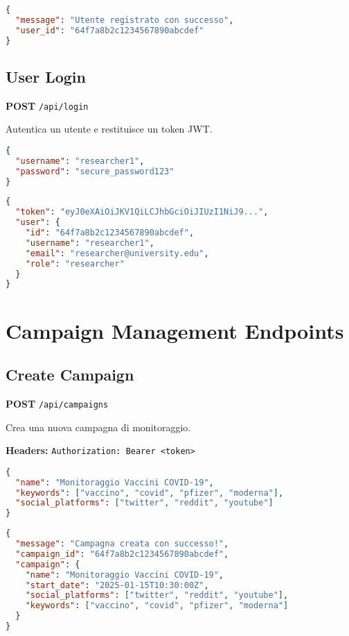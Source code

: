 \documentclass[12pt,a4paper]{report}
\begin{document}
\begin{lstlisting}[language=json, caption=Response (201 Created)]
{
  "message": "Utente registrato con successo",
  "user_id": "64f7a8b2c1234567890abcdef"
}
\end{lstlisting}

\subsection{User Login}

\textbf{POST} \texttt{/api/login}

Autentica un utente e restituisce un token JWT.

\begin{lstlisting}[language=json, caption=Request Body]
{
  "username": "researcher1",
  "password": "secure_password123"
}
\end{lstlisting}

\begin{lstlisting}[language=json, caption=Response (200 OK)]
{
  "token": "eyJ0eXAiOiJKV1QiLCJhbGciOiJIUzI1NiJ9...",
  "user": {
    "id": "64f7a8b2c1234567890abcdef",
    "username": "researcher1",
    "email": "researcher@university.edu",
    "role": "researcher"
  }
}
\end{lstlisting}

\section{Campaign Management Endpoints}

\subsection{Create Campaign}

\textbf{POST} \texttt{/api/campaigns}

Crea una nuova campagna di monitoraggio.

\textbf{Headers:} \texttt{Authorization: Bearer <token>}

\begin{lstlisting}[language=json, caption=Request Body]
{
  "name": "Monitoraggio Vaccini COVID-19",
  "keywords": ["vaccino", "covid", "pfizer", "moderna"],
  "social_platforms": ["twitter", "reddit", "youtube"]
}
\end{lstlisting}

\begin{lstlisting}[language=json, caption=Response (201 Created)]
{
  "message": "Campagna creata con successo!",
  "campaign_id": "64f7a8b2c1234567890abcdef",
  "campaign": {
    "name": "Monitoraggio Vaccini COVID-19",
    "start_date": "2025-01-15T10:30:00Z",
    "social_platforms": ["twitter", "reddit", "youtube"],
    "keywords": ["vaccino", "covid", "pfizer", "moderna"]
  }
}
\end{lstlisting}
\end{document}
